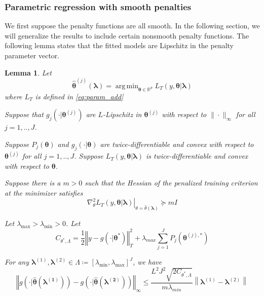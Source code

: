 \documentclass[12pt]{article}
\newtheorem{lemma}{Lemma}
\DeclareMathOperator*{\argmin}{arg\,min}
\begin{document}
\subsubsection{Parametric regression with smooth penalties}
We first suppose the penalty functions are all smooth. In the following section, we will generalize the results to include certain nonsmooth penalty functions. The following lemma states that the fitted models are Lipschitz in the penalty parameter vector.
\begin{lemma}
	\label{lemma:param_add}
	Let 
	\begin{equation}
	\label{eq:param_add_estimator}
	\hat{\boldsymbol{\theta}}^{(j)}\left (\boldsymbol{\lambda}\right )  = 
	\argmin_{\boldsymbol{\theta} \in \mathbb{R}^p} L_T \left (y, \boldsymbol{\theta} | \boldsymbol{\lambda} \right )
	\end{equation}
	where $L_T$ is defined in \eqref{eq:param_add}
	
	Suppose that $g_j(\cdot| \boldsymbol{\theta}^{(j)})$ are $L$-Lipschitz in $\boldsymbol{\theta}^{(j)}$ with respect to $\| \cdot \|_\infty$ for all $j=1,..,J$.
	
	Suppose $P_j(\boldsymbol{\theta})$ and $g_j(\cdot| \boldsymbol{\theta})$ are twice-differentiable and convex with respect to $\boldsymbol{\theta}^{(j)}$ for all $j=1,..,J$. Suppose $L_T\left (y, \boldsymbol{\theta} | \boldsymbol{\lambda} \right )$ is twice-differentiable and convex with respect to $\boldsymbol{\theta}$.
	
	Suppose there is a $m > 0$ such that the Hessian of the penalized training criterion at the minimizer satisfies 
	\begin{equation}
	\left . \nabla_{\theta}^2 L_T(y, \boldsymbol{\theta} | \boldsymbol{\lambda}) \right |_{\theta = \hat{\theta}(\boldsymbol{\lambda})} \succeq mI
	\end{equation}
	
	Let $\lambda_{\max} > \lambda_{\min} > 0 $. Let
	\begin{equation}
	C_{\theta^{*},\Lambda}=
	\frac{1}{2}\left\Vert y- g(\cdot|\boldsymbol{\theta}^{*})\right\Vert _{T}^{2}
	+\lambda_{max}\sum_{j=1}^{J} P_{j}(\boldsymbol{\theta}^{(j),*})
	\end{equation}
	
	For any $\boldsymbol{\lambda}^{(1)}, \boldsymbol{\lambda}^{(2)} \in \Lambda \coloneqq \left [ \lambda_{\min}, \lambda_{\max} \right ]^J$, we have
	\begin{equation}
	\label{eq:param_add_lipschitz}
	\left\Vert g\left(\cdot|\hat{\boldsymbol{\theta}}(\boldsymbol{\lambda^{(1)}})\right)-g\left(\cdot|\hat{\boldsymbol{\theta}}(\boldsymbol{\lambda^{(2)}})\right)\right\Vert _{\infty}
	\le
	\frac{L^{2}J^{2}\sqrt{2C_{\theta^{*},\Lambda}}}{m \lambda_{min}}
	\left \|\boldsymbol{\lambda}^{(1)}-\boldsymbol{\lambda}^{(2)} \right \|
	\end{equation}
\end{lemma}
\end{document}

